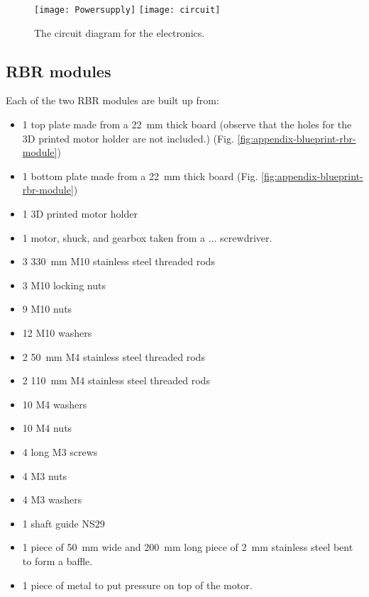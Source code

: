 \begin{figure}[htbp]
  \centering
  \texttt{[image: Powersupply]}
  \texttt{[image: circuit]}
  \caption{The circuit diagram for the electronics.}
  \label{fig:appendix-circuit-diagrams}
\end{figure}


\subsection{RBR modules}

Each of the two RBR modules are built up from:

\begin{itemize}
  \item 1 top plate made from a 22~mm thick board (observe that the holes for
    the 3D printed motor holder are not included.) (Fig. \ref{fig:appendix-blueprint-rbr-module})
  \item 1 bottom plate made from a 22~mm thick board (Fig. \ref{fig:appendix-blueprint-rbr-module})
  \item 1 3D printed motor holder
  \item 1 motor, shuck, and gearbox taken from a $\dots$
    screwdriver.
  \item 3 330~mm M10 stainless steel threaded rods
  \item 3 M10 locking nuts
  \item 9 M10 nuts
  \item 12 M10 washers
  \item 2 50~mm M4 stainless steel threaded rods
  \item 2 110~mm M4 stainless steel threaded rods
  \item 10 M4 washers
  \item 10 M4 nuts
  \item 4 long M3 screws
  \item 4 M3 nuts
  \item 4 M3 washers
  \item 1 shaft guide NS29
  \item 1 piece of 50~mm wide and 200~mm long piece of 2~mm stainless steel
    bent to form a baffle.
  \item 1 piece of metal to put pressure on top of the motor.
\end{itemize}


